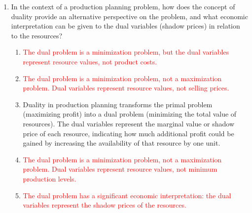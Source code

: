 \documentclass{article}%
\newcommand{\incorrect}[1]{\textcolor{red}{#1}}
\begin{document}
\begin{enumerate}
\begin{enumerate}
\item \incorrect{Constraints are about upper bounds on resource usage, not lower bounds on production. Technological coefficients are not profit margins but resource consumption rates.}%
\item Constraints in a production planning problem reflect resource limitations by setting upper bounds on the total consumption of each resource. Technological coefficients represent the amount of each resource needed to produce one unit of each product.  These coefficients are crucial for linking production quantities to resource usage in the constraints.%
\item \incorrect{Constraints are about upper bounds on resource usage, not lower bounds. Technological coefficients are not resource unit costs but resource consumption rates per unit of product.}%
\item \incorrect{Constraints are not about profit limits but about resource limits. Technological coefficients are not production quantities but resource consumption rates per unit of product.}%
\end{enumerate}%
\vspace{1em}%
\item In the context of a production planning problem, how does the concept of duality provide an alternative perspective on the problem, and what economic interpretation can be given to the dual variables (shadow prices) in relation to the resources?%
\begin{enumerate}%
\item \incorrect{The dual problem is a minimization problem, but the dual variables represent resource values, not product costs.}%
\item \incorrect{The dual problem is a minimization problem, not a maximization problem. Dual variables represent resource values, not selling prices.}%
\item Duality in production planning transforms the primal problem (maximizing profit) into a dual problem (minimizing the total value of resources). The dual variables represent the marginal value or shadow price of each resource, indicating how much additional profit could be gained by increasing the availability of that resource by one unit.%
\item \incorrect{The dual problem is a minimization problem, not a maximization problem. Dual variables represent resource values, not minimum production levels.}%
\item \incorrect{The dual problem has a significant economic interpretation: the dual variables represent the shadow prices of the resources.}%

\end{enumerate}
\end{enumerate}
\end{document}
